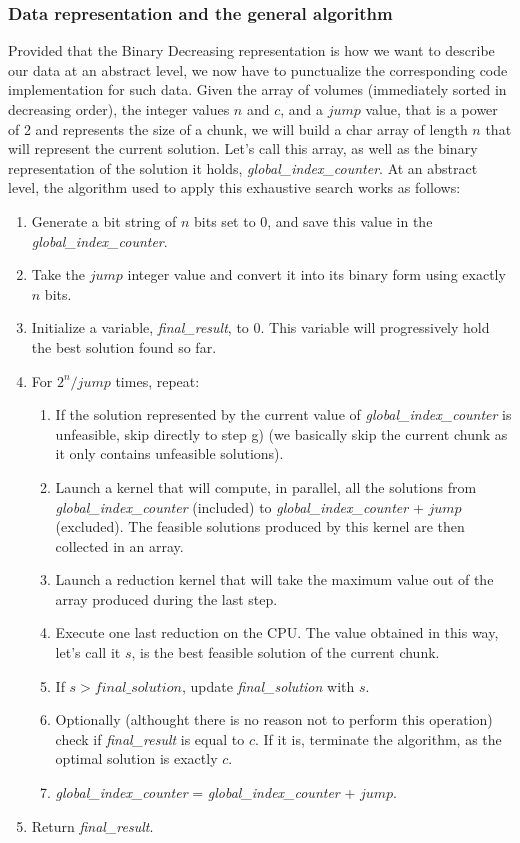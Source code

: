 \documentclass[12pt]{extarticle}
\begin{document}
 \subsubsection{Data representation and the general algorithm}
 Provided that the Binary Decreasing representation is how we want to describe our data at an abstract level, we now have to punctualize the corresponding code implementation for such data. Given the array of volumes (immediately sorted in decreasing order), the integer values $n$ and $c$, and a $jump$ value, that is a power of 2 and represents the size of a chunk, we will build a char array of length $n$ that will represent the current solution. Let's call this array, as well as the binary representation of the solution it holds, \emph{global\_index\_counter}. At an abstract level, the algorithm used to apply this exhaustive search works as follows:
 \begin{enumerate}
     \item Generate a bit string of $n$ bits set to 0, and save this value in the \emph{global\_index\_counter}.
     \item Take the $jump$ integer value and convert it into its binary form using exactly $n$ bits.
     \item Initialize a variable, \emph{final\_result}, to 0. This variable will progressively hold the best solution found so far.
     \item For $2^{n} / jump$ times, repeat:
    \begin{enumerate}
        \item If the solution represented by the current value of \emph{global\_index\_counter} is unfeasible, skip directly to step g) (we basically skip the current chunk as it only contains unfeasible solutions).
        \item Launch a kernel that will compute, in parallel, all the solutions from \emph{global\_index\_counter} (included) to \emph{global\_index\_counter} + $jump$ (excluded). The feasible solutions produced by this kernel are then collected in an array.
        \item Launch a reduction kernel that will take the maximum value out of the array produced during the last step.
        \item Execute one last reduction on the CPU. The value obtained in this way, let's call it $s$, is the best feasible solution of the current chunk.
        \item If $s > final\_solution$, update \emph{final\_solution} with $s$.
        \item Optionally (althought there is no reason not to perform this operation) check if \emph{final\_result} is equal to $c$. If it is, terminate the algorithm, as the optimal solution is exactly $c$.
        \item \emph{global\_index\_counter} = \emph{global\_index\_counter} + $jump$.
    \end{enumerate}
    \item Return \emph{final\_result}.
 \end{enumerate}
\end{document}
